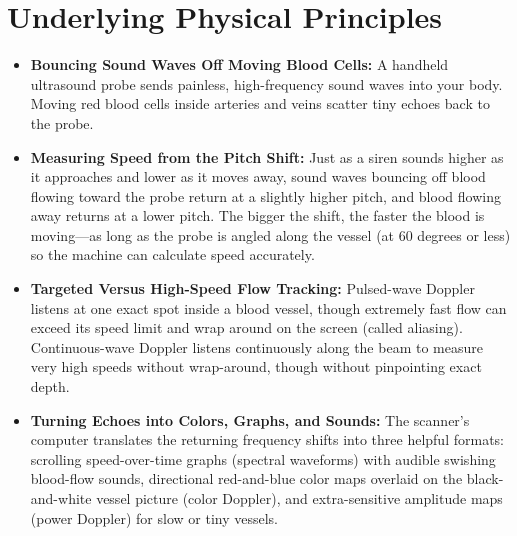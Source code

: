 \section{Underlying Physical Principles}
\begin{itemize}
\item \textbf{Bouncing Sound Waves Off Moving Blood Cells:} A handheld ultrasound probe sends painless, high-frequency sound waves into your body. Moving red blood cells inside arteries and veins scatter tiny echoes back to the probe.
\item \textbf{Measuring Speed from the Pitch Shift:} Just as a siren sounds higher as it approaches and lower as it moves away, sound waves bouncing off blood flowing toward the probe return at a slightly higher pitch, and blood flowing away returns at a lower pitch. The bigger the shift, the faster the blood is moving---as long as the probe is angled along the vessel (at 60 degrees or less) so the machine can calculate speed accurately.
\item \textbf{Targeted Versus High-Speed Flow Tracking:} Pulsed-wave Doppler listens at one exact spot inside a blood vessel, though extremely fast flow can exceed its speed limit and wrap around on the screen (called aliasing). Continuous-wave Doppler listens continuously along the beam to measure very high speeds without wrap-around, though without pinpointing exact depth.
\item \textbf{Turning Echoes into Colors, Graphs, and Sounds:} The scanner's computer translates the returning frequency shifts into three helpful formats: scrolling speed-over-time graphs (spectral waveforms) with audible swishing blood-flow sounds, directional red-and-blue color maps overlaid on the black-and-white vessel picture (color Doppler), and extra-sensitive amplitude maps (power Doppler) for slow or tiny vessels.
\end{itemize}

